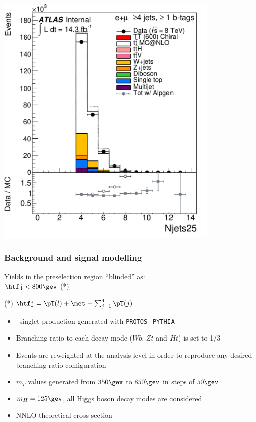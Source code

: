 \begin{frame}
\begin{minipage}{.5\textwidth}
{\includegraphics[width=0.8\textwidth]{pics/Njets25_ELEMUON_4jetin1btagin_NOMINAL}

}

\end{minipage}

\end{frame}

\begin{frame}\frametitle{Background and signal modelling}
\centering\myskip

\begin{minipage}{.5\textwidth}\footnotesize\centering
\scriptsize
Yields in the preselection region ``blinded'' as:\\
$\htfj<800\gev$ (*)
\myskip

  

\myskip
(*) $\htfj = \pT(l) + \met + \sum_{j = 1}^{\rm 4}\pT(j)$
\end{minipage}\begin{minipage}{.5\textwidth}\footnotesize\centering

\begin{itemize}
\item \TTbar\ singlet production generated with {\tt PROTOS}+{\tt PYTHIA}
\item Branching ratio to each decay mode  ($Wb$, $Zt$ and $Ht$) is set to  1/3
\item Events are reweighted at the analysis level in order to reproduce any desired branching ratio configuration
\item $m_{T}$ values generated from $350\gev$ to $850\gev$ in steps of $50\gev$
\item $m_H=125\gev$, all Higgs boson decay modes are considered
\item NNLO theoretical cross section
\end{itemize}

\end{minipage}


\end{frame}

